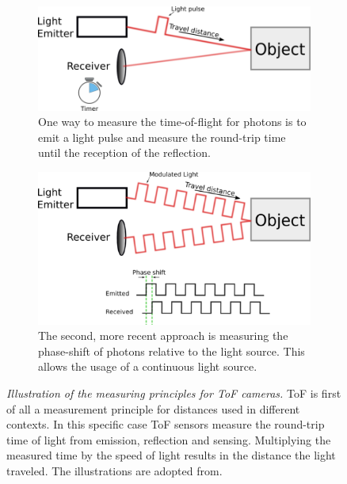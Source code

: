 \begin{figure}[b!]
    \centering
    \begin{subfigure}[t]{0.45\textwidth}
        \includegraphics[width=\textwidth]{chapter03/img/tof_traveltime_original.png}
        \caption{One way to measure the time-of-flight for photons is to emit a light pulse and measure the round-trip time until the reception of the reflection.}\label{fig:tof_roundtrip}
    \end{subfigure}\quad
    \begin{subfigure}[t]{0.45\textwidth}
        \includegraphics[width=\textwidth]{chapter03/img/tof_phase_shift_original.png}
        \caption{The second, more recent approach is measuring the phase-shift of photons relative to the light source. This allows the usage of a continuous light source.}\label{fig:tof_phase_shift}
    \end{subfigure}
    \caption[Illustration of the measuring principles for \acrshort{ToF} cameras]{\emph{Illustration of the measuring principles for \acrshort{ToF} cameras.} \acrlong{ToF} is first of all a measurement principle for distances used in different contexts. In this specific case \acrshort{ToF} sensors measure the round-trip time of light from emission, reflection and sensing. Multiplying the measured time by the speed of light results in the distance the light traveled. The illustrations are adopted from\cite{tof_cameras}.}\label{fig:tof_illustration}
\end{figure}
